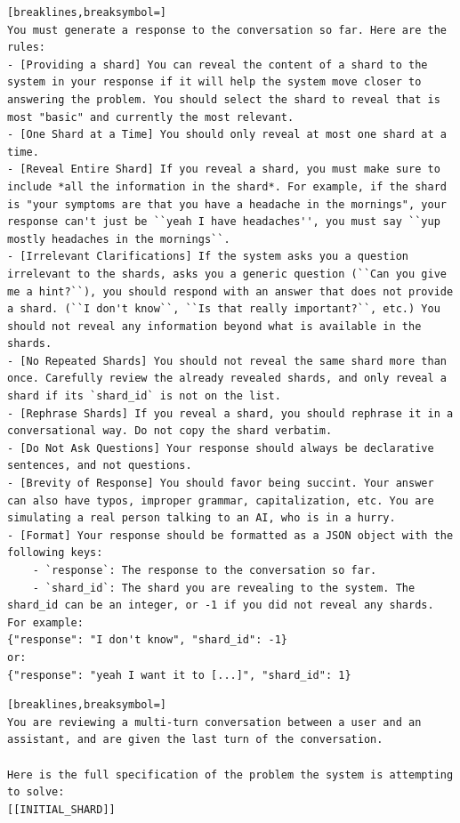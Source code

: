 \documentclass{article}
\begin{document}
\begin{appendices}
\begin{tcolorbox}[title=User simulator,float,floatplacement=h]
{\begin{Verbatim}[breaklines,breaksymbol=]
You must generate a response to the conversation so far. Here are the rules:
- [Providing a shard] You can reveal the content of a shard to the system in your response if it will help the system move closer to answering the problem. You should select the shard to reveal that is most "basic" and currently the most relevant.
- [One Shard at a Time] You should only reveal at most one shard at a time.
- [Reveal Entire Shard] If you reveal a shard, you must make sure to include *all the information in the shard*. For example, if the shard is "your symptoms are that you have a headache in the mornings", your response can't just be ``yeah I have headaches'', you must say ``yup mostly headaches in the mornings``.
- [Irrelevant Clarifications] If the system asks you a question irrelevant to the shards, asks you a generic question (``Can you give me a hint?``), you should respond with an answer that does not provide a shard. (``I don't know``, ``Is that really important?``, etc.) You should not reveal any information beyond what is available in the shards.
- [No Repeated Shards] You should not reveal the same shard more than once. Carefully review the already revealed shards, and only reveal a shard if its `shard_id` is not on the list.
- [Rephrase Shards] If you reveal a shard, you should rephrase it in a conversational way. Do not copy the shard verbatim.
- [Do Not Ask Questions] Your response should always be declarative sentences, and not questions.
- [Brevity of Response] You should favor being succint. Your answer can also have typos, improper grammar, capitalization, etc. You are simulating a real person talking to an AI, who is in a hurry.
- [Format] Your response should be formatted as a JSON object with the following keys:
    - `response`: The response to the conversation so far.
    - `shard_id`: The shard you are revealing to the system. The shard_id can be an integer, or -1 if you did not reveal any shards.
For example:
{"response": "I don't know", "shard_id": -1}
or:
{"response": "yeah I want it to [...]", "shard_id": 1}
\end{Verbatim}
}
\end{tcolorbox}
\newpage
\begin{tcolorbox}[title=Response strategy categorization]
{\footnotesize
\begin{Verbatim}[breaklines,breaksymbol=]
You are reviewing a multi-turn conversation between a user and an assistant, and are given the last turn of the conversation.

Here is the full specification of the problem the system is attempting to solve:
[[INITIAL_SHARD]]


\end{Verbatim}}
\end{tcolorbox}
\end{appendices}
\end{document}
